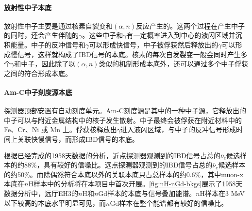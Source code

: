 \documentclass[a4paper,zihao=-4]{article}
\begin{document}
\paragraph{}
\paragraph{放射性中子本底}
放射性中子主要是通过核素自裂变和$(\alpha,n)$反应产生的。这两个过程在产生中子的同时，还会产生伴随的$\gamma$。这些中子和$\gamma$有一定概率进入到中心的液闪区域并沉积能量。中子的反冲信号和$\gamma$可以形成快信号，中子被俘获然后释放出的$\gamma$可以形成慢信号，这样就构成了IBD信号的本底。核素的每次自发裂变一般会同时产生多个$\gamma$和中子，因此除了以$(\alpha,n)$类似的机制形成本底外，还可以通过多个中子俘获之间的符合形成本底。
\paragraph{Am-C中子刻度源本底}
探测器顶部安置有自动刻度单元。Am-C刻度源是其中的一种中子源，它释放出的中子可以与附近金属结构中的核子发生散射。中子最终会被俘获在附近材料中的 Fe、Cr、Ni 或 Mn 上。俘获核释放出$\gamma$进入液闪区域，与中子的反冲信号形成时间上关联快慢信号，而形成IBD信号的本底。

根据已经完成的1958天数据的分析，近点探测器观测到的IBD信号占总的$\overline{\nu}_e$候选样本的约88\%，具有较好的信噪比。远点探测器观测到的IBD信号占总的$\overline{\nu}_e$候选样本的约50\%。而除偶然符合本底以外的关联本底只占总样本的约0.6\%，其中muon-x本底在$n$H样本中的分析将在本项目中首次开展。\cref{fig:nH-nGd-bkgs}展示了1958天数据分析中，远厅EH3的$n$H和$n$Gd样本的本底与信号叠加能谱。$n$H样本在3 MeV以下较高的本底水平明显可见，而$n$Gd样本在整个能谱都有较好的信噪比。
\end{document}
